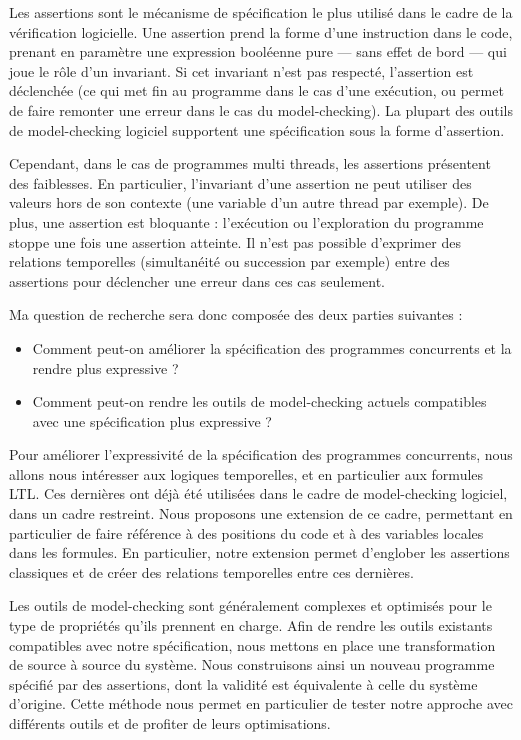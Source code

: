 Les assertions sont le mécanisme de spécification le plus utilisé dans
le cadre de la vérification logicielle. Une assertion prend la forme
d'une instruction dans le code, prenant en paramètre une expression
booléenne pure --- sans effet de bord --- qui joue le rôle d'un
invariant. Si cet invariant n'est pas respecté, l'assertion est
déclenchée (ce qui met fin au programme dans le cas d'une exécution, ou
permet de faire remonter une erreur dans le cas du model-checking). La
plupart des outils de model-checking logiciel supportent une
spécification sous la forme d'assertion.

Cependant, dans le cas de programmes multi threads, les assertions
présentent des faiblesses. En particulier, l'invariant d'une assertion
ne peut utiliser des valeurs hors de son contexte (une variable d'un
autre thread par exemple). De plus, une assertion est bloquante :
l'exécution ou l'exploration du programme stoppe une fois une assertion
atteinte. Il n'est pas possible d'exprimer des relations temporelles
(simultanéité ou succession par exemple) entre des assertions pour
déclencher une erreur dans ces cas seulement.

Ma question de recherche sera donc composée des deux parties suivantes :

\begin{itemize}
\item
  Comment peut-on améliorer la spécification des programmes concurrents
  et la rendre plus expressive ?
\item
  Comment peut-on rendre les outils de model-checking actuels
  compatibles avec une spécification plus expressive ?
\end{itemize}

Pour améliorer l'expressivité de la spécification des programmes
concurrents, nous allons nous intéresser aux logiques temporelles, et en
particulier aux formules \ac{LTL}. Ces dernières ont déjà été utilisées dans
le cadre de model-checking logiciel, dans un cadre restreint. Nous
proposons une extension de ce cadre, permettant en particulier de faire
référence à des positions du code et à des variables locales dans les
formules. En particulier, notre extension permet d'englober les
assertions classiques et de créer des relations temporelles entre ces
dernières.

Les outils de model-checking sont généralement complexes et optimisés
pour le type de propriétés qu'ils prennent en charge. Afin de rendre
les outils existants compatibles avec notre spécification, nous mettons
en place une transformation de source à source du système. Nous
construisons ainsi un nouveau programme spécifié par des assertions,
dont la validité est équivalente à celle du système d'origine. Cette
méthode nous permet en particulier de tester notre approche avec
différents outils et de profiter de leurs optimisations.

